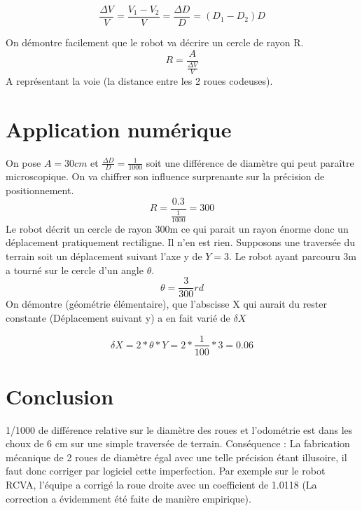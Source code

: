 \documentclass[a4paper]{report}
\begin{document}
\begin{equation}
\frac{\Delta V}{V} = \frac{V_1-V_2}{V} = \frac{\Delta D}{D} = (D_1-D_2)D
\end{equation}

On démontre facilement que le robot va décrire un cercle de rayon R.
\begin{equation}
R= \frac{A}{\frac{\Delta V}{V}}
\end{equation}
A représentant la voie (la distance entre les 2 roues codeuses).

\section{Application numérique}

On pose $A=30 cm$ et  $\frac{\Delta D}{D}=\frac{1}{1000}$ soit une différence de diamètre qui peut paraître microscopique. On va chiffrer son influence surprenante sur la précision de positionnement.
\begin{equation}
R=\frac{0.3}{\frac{1}{1000}}= 300
\end{equation}
Le robot décrit un cercle de rayon 300m ce qui parait un rayon énorme donc un déplacement pratiquement rectiligne. Il n’en est rien.
Supposons une traversée du terrain soit un déplacement suivant l’axe y de $Y=3$.
Le robot ayant parcouru 3m a tourné sur le cercle d’un angle $\theta$.
\begin{equation}
\theta=\frac{3}{300} rd
\end{equation}
On démontre (géométrie élémentaire), que l’abscisse X qui aurait du rester constante (Déplacement suivant y) a en fait varié de $\delta X$ 

\begin{equation}
\delta X= 2*\theta*Y = 2 *\frac{1}{100}*3= 0.06
\end{equation}

\section{Conclusion} 
1/1000 de différence relative sur le diamètre des roues et l’odométrie est dans les choux de 6 cm sur une simple traversée de terrain.
Conséquence : La fabrication mécanique de 2 roues de diamètre égal avec une telle précision étant illusoire, il faut donc corriger par logiciel cette imperfection.
Par exemple sur le robot RCVA, l’équipe a corrigé la roue droite avec un coefficient de 1.0118 (La correction a évidemment été faite de manière empirique).
\end{document}
